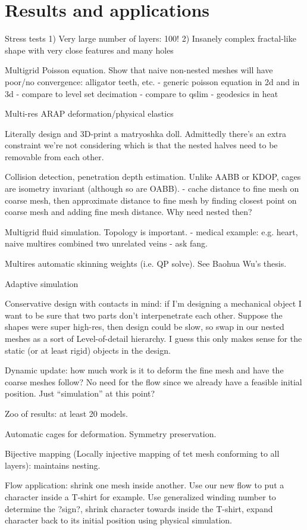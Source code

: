 
\section{Results and applications}
\label{sec:results}

Stress tests
  1) Very large number of layers: 100!
  2) Insanely complex fractal-like shape with very close features and many holes

Multigrid Poisson equation. Show that naive non-nested meshes will have
poor/no convergence: alligator teeth, etc.
  - generic poisson equation in 2d and in 3d
    - compare to level set decimation
    - compare to qslim
  - geodesics in heat 

Multi-res ARAP deformation/physical elastics

Literally design and 3D-print a matryoshka doll. Admittedly there's an extra
constraint we're not considering which is that the nested halves need to be
removable from each other.

Collision detection, penetration depth estimation. Unlike AABB or KDOP, cages
are isometry invariant (although so are OABB).
  - cache distance to fine mesh on coarse mesh, then approximate distance to
    fine mesh by finding closest point on coarse mesh and adding fine mesh
    distance. Why need nested then?

Multigrid fluid simulation. Topology is important.
  - medical example: e.g. heart, naive multires combined two unrelated veins
  - ask fang.

Multires automatic skinning weights (i.e. QP solve). See Baohua Wu's thesis.

Adaptive simulation \cite{Debunne:2001:DRD}

Conservative design with contacts in mind: if I'm designing a mechanical object
I want to be sure that two parts don't interpenetrate each other. Suppose the
shapes were super high-res, then design could be slow, so swap in our nested
meshes as a sort of Level-of-detail hierarchy. I guess this only makes sense
for the static (or at least rigid) objects in the design.

Dynamic update: how much work is it to deform the fine mesh and have the coarse
meshes follow? No need for the flow since we already have a feasible initial
position. Just ``simulation'' at this point?

Zoo of results: at least 20 models.

Automatic cages for deformation. Symmetry preservation.

Bijective mapping (Locally injective mapping of tet mesh conforming to all
layers): maintains nesting.

Flow application: shrink one mesh inside another. Use our new flow to put a 
character inside a T-shirt for example. Use generalized winding number to 
determine the ?sign?, shrink character towards inside the T-shirt, 
expand character back to its initial position using physical simulation. 
